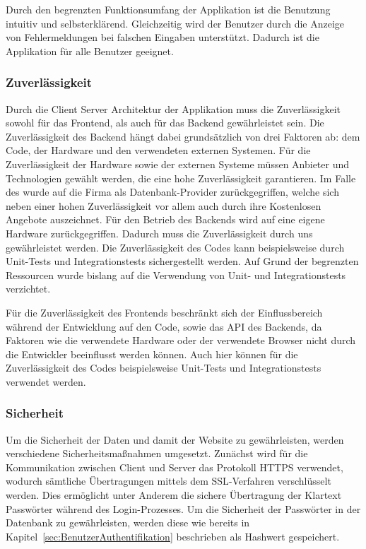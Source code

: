 Durch den begrenzten Funktionsumfang der Applikation ist die Benutzung intuitiv und selbsterklärend.
Gleichzeitig wird der Benutzer durch die Anzeige von Fehlermeldungen bei falschen Eingaben unterstützt.
Dadurch ist die Applikation für alle Benutzer geeignet.

\subsubsection{Zuverlässigkeit}
Durch die Client Server Architektur der Applikation muss die Zuverlässigkeit sowohl für das Frontend, als auch für das Backend gewährleistet sein.
Die Zuverlässigkeit des Backend hängt dabei grundsätzlich von drei Faktoren ab: dem Code, der Hardware und den verwendeten externen Systemen.
Für die Zuverlässigkeit der Hardware sowie der externen Systeme müssen Anbieter und Technologien gewählt werden, die eine hohe Zuverlässigkeit garantieren.
Im Falle des  wurde auf die Firma  als Datenbank-Provider zurückgegriffen, welche sich neben einer hohen Zuverlässigkeit vor allem auch durch ihre Kostenlosen Angebote auszeichnet.
Für den Betrieb des Backends wird auf eine eigene Hardware zurückgegriffen.
Dadurch muss die Zuverlässigkeit durch uns gewährleistet werden.
Die Zuverlässigkeit des Codes kann beispielsweise durch Unit-Tests und Integrationstests sichergestellt werden.
Auf Grund der begrenzten Ressourcen wurde bislang auf die Verwendung von Unit- und Integrationstests verzichtet.

\noindent{}Für die Zuverlässigkeit des Frontends beschränkt sich der Einflussbereich während der Entwicklung auf den Code, sowie das \ac{API} des Backends, da Faktoren wie die verwendete Hardware oder der verwendete Browser nicht durch die Entwickler beeinflusst werden können.
Auch hier können für die Zuverlässigkeit des Codes beispielsweise Unit-Tests und Integrationstests verwendet werden.

\subsubsection{Sicherheit}
Um die Sicherheit der Daten und damit der Website zu gewährleisten, werden verschiedene Sicherheitsmaßnahmen umgesetzt.
Zunächst wird für die Kommunikation zwischen Client und Server das Protokoll \ac{HTTPS} verwendet, wodurch sämtliche Übertragungen mittels dem \ac{SSL}-Verfahren verschlüsselt werden.
Dies ermöglicht unter Anderem die sichere Übertragung der Klartext Passwörter während des Login-Prozesses.
Um die Sicherheit der Passwörter in der Datenbank zu gewährleisten, werden diese wie bereits in Kapitel~\ref{sec:BenutzerAuthentifikation} beschrieben als Hashwert gespeichert.

